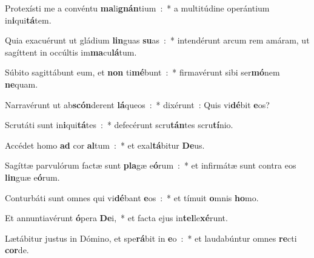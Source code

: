 ﻿\item Protexísti me a convéntu \textbf{ma}li\textbf{gnán}tium~:~* a multitúdine operántium in\textbf{i}qui\textbf{tá}tem.
\item Quia exacuérunt ut gládium \textbf{lin}guas \textbf{su}as~:~* intendérunt arcum rem amáram, ut sagíttent in occúltis im\textbf{ma}cu\textbf{lá}tum.
\item Súbito sagittábunt eum, et \textbf{non} ti\textbf{mé}bunt~:~* firmavérunt sibi ser\textbf{mó}nem \textbf{ne}quam.
\item Narravérunt ut ab\textbf{scón}derent \textbf{lá}queos~:~* dixérunt~: Quis vi\textbf{dé}bit \textbf{e}os?
\item Scrutáti sunt in\textbf{i}qui\textbf{tá}tes~:~* defecérunt scru\textbf{tán}tes scru\textbf{tí}nio.
\item Accédet homo \textbf{ad} cor \textbf{al}tum~:~* et exal\textbf{tá}bitur \textbf{De}us.
\item Sagíttæ parvulórum factæ sunt \textbf{pla}gæ e\textbf{ó}rum~:~* et infirmátæ sunt contra eos \textbf{lin}guæ e\textbf{ó}rum.
\item Conturbáti sunt omnes qui vi\textbf{dé}bant \textbf{e}os~:~* et tímuit \textbf{o}mnis \textbf{ho}mo.
\item Et annuntiavérunt \textbf{ó}pera \textbf{De}i,~* et facta ejus in\textbf{tel}le\textbf{xé}runt.
\item Lætábitur justus in Dómino, et spe\textbf{rá}bit in \textbf{e}o~:~* et laudabúntur omnes \textbf{re}cti \textbf{cor}de.